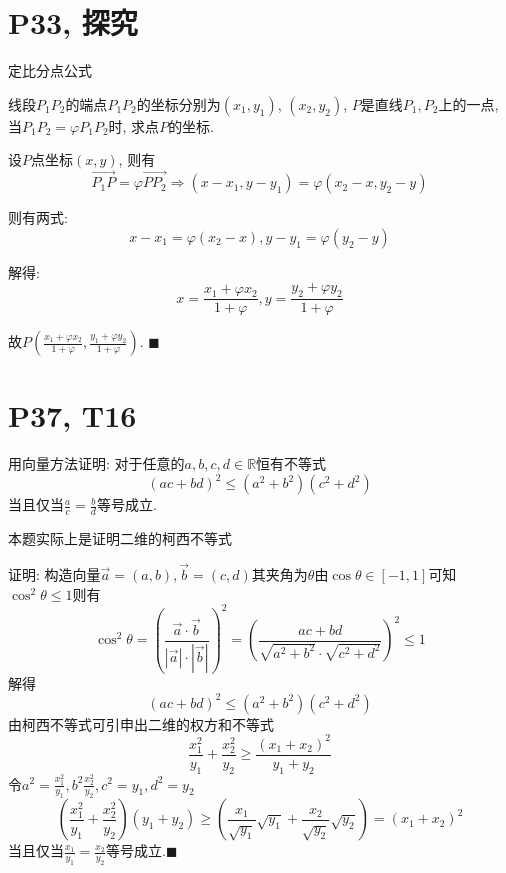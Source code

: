 \documentclass{book}
\begin{document}
        \section{\textcolor[rgb]{0.11,0.65,0.52}{P33, 探究}}
        
        \begin{boxB}
            定比分点公式

            线段$P_1P_2$的端点$P_1P_2$的坐标分别为$(x_1,y_1)$, $(x_2,y_2)$, $P$是直线$P_1,P_2$上的一点, 当$P_1P_2=\varphi P_1P_2$时, 求点$P$的坐标.
        \end{boxB}
        设$P$点坐标$(x,y)$, 则有$$\overrightarrow{P_1P}=\varphi \overrightarrow{PP_2}\Longrightarrow (x-x_1,y-y_1)=\varphi(x_2-x, y_2-y)$$

        则有两式: $$x-x_1=\varphi (x_2-x),y-y_1=\varphi (y_2-y)$$

        解得:$$x=\frac{x_1+\varphi x_2}{1+\varphi},y=\frac{y_2+\varphi y_2}{1+\varphi}$$
        
        故$\displaystyle P(\frac{x_1+\varphi x_2}{1+\varphi},\frac{y_1+\varphi y_2}{1+\varphi})$. $\blacksquare$

        \section{\textcolor[rgb]{0.11,0.65,0.52}{P37, T16}}
        \begin{boxB}
            用向量方法证明: 对于任意的$a,b,c,d \in \mathbb{R}$恒有不等式$$(ac+bd)^2\le(a^2+b^2)(c^2+d^2)$$
            当且仅当$\displaystyle \frac{a}{c}=\frac{b}{d}$等号成立.
        \end{boxB}

        本题实际上是证明\textcolor[rgb]{0.38,0.11,0.2}{二维的柯西不等式}

        证明: 构造向量$\overrightarrow{a}=(a,b),\overrightarrow{b}=(c,d)$其夹角为$\theta$由$\cos \theta \in [-1,1]$可知$\cos ^2 \theta \le 1$则有$$\cos ^2 \theta=\left (\frac{\overrightarrow{a}\cdot \overrightarrow{b}}{|\overrightarrow{a}|\cdot |\overrightarrow{b}|}\right ) ^2=\left ( \frac{ac+bd}{\sqrt{a^2+b^2}\cdot \sqrt{c^2+d^2}} \right )^2 \le 1$$
        解得$$(ac+bd)^2 \le (a^2+b^2)(c^2+d^2)$$
        由\textcolor[rgb]{0.38,0.11,0.2}{柯西不等式}可引申出\textcolor[rgb]{0.38,0.11,0.2}{二维的权方和不等式}$$\frac{x_1^2}{y_1}+\frac{x_2^2}{y_2}\ge \frac{(x_1+x_2)^2}{y_1+y_2}$$
        令$\displaystyle a^2=\frac{x_1^2}{y_1},b^2\frac{x_2^2}{y_2},c^2=y_1,d^2=y_2$
        $$\left ( \frac{x_1^2}{y_1}+\frac{x_2^2}{y_2} \right )(y_1+y_2)\ge \left ( \frac{x_1}{\sqrt{y_1}}\sqrt{y_1}+\frac{x_2}{\sqrt{y_2}}\sqrt{y_2} \right )=(x_1+x_2)^2$$
        当且仅当$\displaystyle \frac{x_1}{y_1}=\frac{x_2}{y_2}$等号成立.$\blacksquare$
\end{document}
